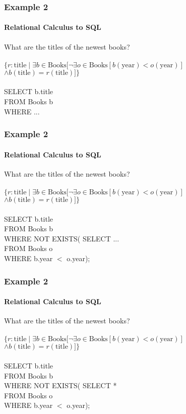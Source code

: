 \documentclass{beamer}
\begin{document}
\begin{frame}
  \frametitle{Example 2}
    \framesubtitle{Relational Calculus to SQL}
  What are the titles of the newest books?\\
  \hfill \\
  $\{r:\text{title} \mid \exists b \in \text{Books} [ \neg\exists o \in \text{Books} [ b(\text{year}) < o(\text{year})]$\\
  $\land b(\text{title}) = r(\text{title})] \}$\\
  \hfill \\
  SELECT b.title\\
  FROM Books b\\
  WHERE ...
\end{frame}
\begin{frame}
  \frametitle{Example 2}
    \framesubtitle{Relational Calculus to SQL}
  What are the titles of the newest books?\\
  \hfill \\
  $\{r:\text{title} \mid \exists b \in \text{Books} [ \neg\exists o \in \text{Books} [ b(\text{year}) < o(\text{year})]$\\
  $\land b(\text{title}) = r(\text{title})] \}$\\
  \hfill \\
  SELECT b.title\\
  FROM Books b\\
  WHERE NOT EXISTS( SELECT ...\\
  FROM Books o \\
  WHERE b.year $<$ o.year);
\end{frame}
\begin{frame}
  \frametitle{Example 2}
    \framesubtitle{Relational Calculus to SQL}
  What are the titles of the newest books?\\
  \hfill \\
  $\{r:\text{title} \mid \exists b \in \text{Books} [ \neg\exists o \in \text{Books} [ b(\text{year}) < o(\text{year})]$\\
  $\land b(\text{title}) = r(\text{title})] \}$\\
  \hfill \\
  SELECT b.title\\
  FROM Books b\\
  WHERE NOT EXISTS( SELECT *\\
  FROM Books o\\
  WHERE b.year $<$ o.year);
\end{frame}
\end{document}
